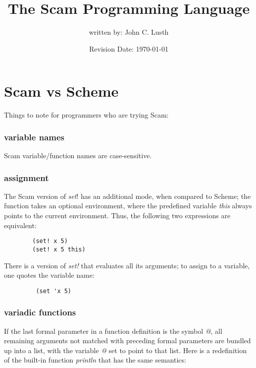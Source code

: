 \documentclass{article}
\title{The Scam Programming Language}
\author{written by: John C. Lusth}
\date{Revision Date: \today}
\begin{document}
\maketitle

\W\htmlrule

\W\subsubsection{}

\section{Scam vs Scheme}

Things to note for programmers who are trying Scam:

\subsubsection*{variable names}

    Scam variable/function names are case-sensitive.

\subsubsection*{assignment}

    The Scam version of {\it set}! has an additional mode, when compared to
    Scheme;
    the function takes an optional environment,
    where the predefined
    variable {\it this} always points to the current environment.
    Thus, the following
    two expressions are equivalent:

\begin{verbatim}
        (set! x 5)
        (set! x 5 this)
\end{verbatim}

    There is a version of {\it set!} that evaluates all its arguments;
    to assign to a variable, one quotes the variable name:

\begin{verbatim}
         (set 'x 5)
\end{verbatim}

\subsubsection*{variadic functions}

    If the last formal parameter in a function definition is the
    symbol {\it @}, all remaining arguments not matched with 
    preceding formal parameters are bundled up into a list, with
    the variable {\it @} set to point to that list. Here is a redefinition
    of the built-in function {\it println} that has the same semantics:
\end{document}
